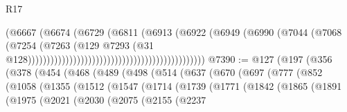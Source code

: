\begin{lexlean}{R17}
\begin{coremodule}
                                                                      (@6667
                                                                        (@6674
                                                                          (@6729
                                                                            (@6811
                                                                              (@6913
                                                                                (@6922
                                                                                  (@6949
                                                                                    (@6990
                                                                                      (@7044
                                                                                        (@7068
                                                                                          (@7254
                                                                                            (@7263
                                                                                              (@129
                                                                                                @7293
                                                                                                (@31
                                                                                                  @128)))))))))))))))))))))))))))))))))))))))))))))))
@7390 := @127
    (@197
      (@356
        (@378
          (@454
            (@468
              (@489
                (@498
                  (@514
                    (@637
                      (@670
                        (@697
                          (@777
                            (@852
                              (@1058
                                (@1355
                                  (@1512
                                    (@1547
                                      (@1714
                                        (@1739
                                          (@1771
                                            (@1842
                                              (@1865
                                                (@1891
                                                  (@1975
                                                    (@2021
                                                      (@2030
                                                        (@2075
                                                          (@2155
                                                            (@2237

\end{coremodule}
\end{lexlean}
